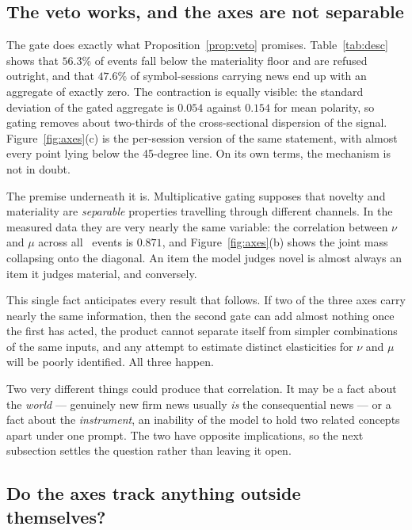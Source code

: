 \subsection{The veto works, and the axes are not separable}\label{sec:descriptive}

The gate does exactly what Proposition~\ref{prop:veto} promises.
Table~\ref{tab:desc} shows that $56.3\%$ of events fall below the materiality
floor and are refused outright, and that $47.6\%$ of symbol-sessions carrying news
end up with an aggregate of exactly zero. The contraction is equally visible: the
standard deviation of the gated aggregate is $0.054$ against $0.154$ for mean
polarity, so gating removes about two-thirds of the cross-sectional dispersion of
the signal. Figure~\ref{fig:axes}(c) is the per-session version of the same
statement, with almost every point lying below the 45-degree line. On its own
terms, the mechanism is not in doubt.

The premise underneath it is. Multiplicative gating supposes that novelty and
materiality are \emph{separable} properties travelling through different channels.
In the measured data they are very nearly the same variable: the correlation
between $\nu$ and $\mu$ across all \ScoredHeadlines\ events is $\mathbf{0.871}$,
and Figure~\ref{fig:axes}(b) shows the joint mass collapsing onto the diagonal. An
item the model judges novel is almost always an item it judges material, and
conversely.

This single fact anticipates every result that follows. If two of the three axes
carry nearly the same information, then the second gate can add almost nothing
once the first has acted, the product cannot separate itself from simpler
combinations of the same inputs, and any attempt to estimate distinct elasticities
for $\nu$ and $\mu$ will be poorly identified. All three happen.

Two very different things could produce that correlation. It may be a fact about
the \emph{world} --- genuinely new firm news usually \emph{is} the consequential
news --- or a fact about the \emph{instrument}, an inability of the model to hold
two related concepts apart under one prompt. The two have opposite implications,
so the next subsection settles the question rather than leaving it open.

\subsection{Do the axes track anything outside themselves?}\label{sec:validity}

